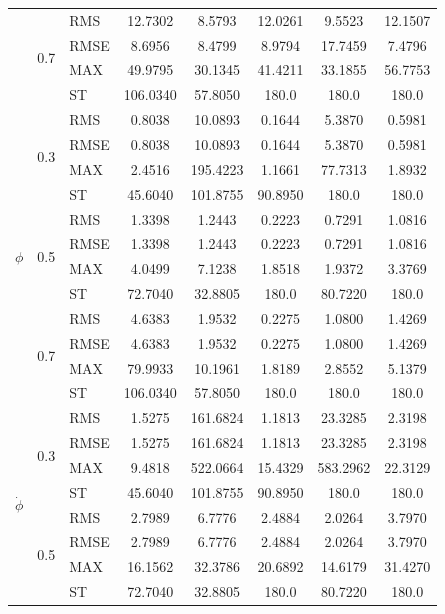 \documentclass[sn-chicago,iicol]{sn-jnl}
\theoremstyle{thmstyleone}%
\theoremstyle{thmstyletwo}%
\theoremstyle{thmstylethree}%
\begin{document}
\begin{table}[!t]
\begin{tabular}{lllccccc}
& \multirow{4}{*}{0.7}
& RMS  & 12.7302 & 8.5793 & 12.0261 & 9.5523 & 12.1507 \\
& & RMSE & 8.6956 & 8.4799 & 8.9794 & 17.7459 & 7.4796 \\
& & MAX  & 49.9795 & 30.1345 & 41.4211 & 33.1855 & 56.7753 \\
& & ST   & 106.0340 & 57.8050 & 180.0 & 180.0 & 180.0 \\

\midrule

\multirow{12}{*}{$\phi$}

& \multirow{4}{*}{0.3}
& RMS  & 0.8038 & 10.0893 & 0.1644 & 5.3870 & 0.5981 \\
& & RMSE & 0.8038 & 10.0893 & 0.1644 & 5.3870 & 0.5981 \\
& & MAX  & 2.4516 & 195.4223 & 1.1661 & 77.7313 & 1.8932 \\
& & ST   & 45.6040 & 101.8755 & 90.8950 & 180.0 & 180.0 \\

& \multirow{4}{*}{0.5}
& RMS  & 1.3398 & 1.2443 & 0.2223 & 0.7291 & 1.0816 \\
& & RMSE & 1.3398 & 1.2443 & 0.2223 & 0.7291 & 1.0816 \\
& & MAX  & 4.0499 & 7.1238 & 1.8518 & 1.9372 & 3.3769 \\
& & ST   & 72.7040 & 32.8805 & 180.0 & 80.7220 & 180.0 \\

& \multirow{4}{*}{0.7}
& RMS  & 4.6383 & 1.9532 & 0.2275 & 1.0800 & 1.4269 \\
& & RMSE & 4.6383 & 1.9532 & 0.2275 & 1.0800 & 1.4269 \\
& & MAX  & 79.9933 & 10.1961 & 1.8189 & 2.8552 & 5.1379 \\
& & ST   & 106.0340 & 57.8050 & 180.0 & 180.0 & 180.0 \\

\midrule

\multirow{12}{*}{$\dot{\phi}$}

& \multirow{4}{*}{0.3}
& RMS  & 1.5275 & 161.6824 & 1.1813 & 23.3285 & 2.3198 \\
& & RMSE & 1.5275 & 161.6824 & 1.1813 & 23.3285 & 2.3198 \\
& & MAX  & 9.4818 & 522.0664 & 15.4329 & 583.2962 & 22.3129 \\
& & ST   & 45.6040 & 101.8755 & 90.8950 & 180.0 & 180.0 \\

& \multirow{4}{*}{0.5}
& RMS  & 2.7989 & 6.7776 & 2.4884 & 2.0264 & 3.7970 \\
& & RMSE & 2.7989 & 6.7776 & 2.4884 & 2.0264 & 3.7970 \\
& & MAX  & 16.1562 & 32.3786 & 20.6892 & 14.6179 & 31.4270 \\
& & ST   & 72.7040 & 32.8805 & 180.0 & 80.7220 & 180.0 \\


\end{tabular}
\end{table}
\end{document}
